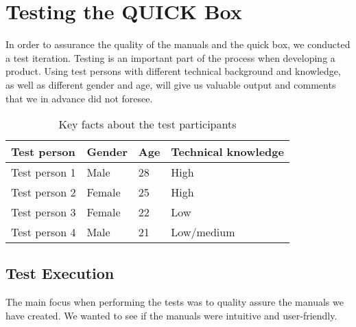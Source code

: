 \chapter{Testing the QUICK Box}
\label{chp:test} 

In order to assurance the quality of the manuals and the \gls{quick} box, we conducted a test iteration. Testing is an important part of the process when developing a product. Using test persons with different technical background and knowledge, as well as different gender and age, will give us valuable output and comments that we in advance did not foresee. 

\begin{center}
\begin{table}[h!]
\caption{\label{tab:testpersons}Key facts about the test participants}
    \begin{tabular}{ | l | l | l | l |}
    \hline
    \textbf{Test person} & \textbf{Gender} & \textbf{Age} & \textbf{Technical knowledge} \\ 
    \hline
    Test person 1 &  Male & 28 & High\\ 
    \hline
    Test person 2 &  Female & 25 & High\\  
    \hline
    Test person 3 &  Female & 22 & Low\\  
    \hline
    Test person 4 &  Male & 21 & Low/medium\\  
    \hline
    \end{tabular}
   \end{table}
\end{center}


\section{Test Execution}
The main focus when performing the tests was to quality assure the manuals we have created. We wanted to see if the manuals were intuitive and user-friendly.

